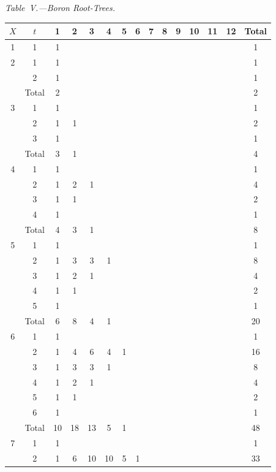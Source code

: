 \documentclass[11pt,a4paper]{article}
\begin{document}
{\textit{Table~V.---Boron Root-Trees.}
\begin{center}
\small
\begin{longtable}{|c|c|c|c|c|c|c|c|c|c|c|c|c|c|c|}
\hline
$X$ & $t$ & 1 & 2 & 3 & 4 & 5 & 6 & 7 & 8 & 9 & 10 & 11 & 12 & Total \\
\hline
\endfirsthead
1 & 1 & 1 & & & & & & & & & & & & 1 \\
\hline
2 & 1 & 1 & & & & & & & & & & & & 1 \\
  & 2 & 1 & & & & & & & & & & & & 1 \\
  & Total & 2 & & & & & & & & & & & & 2 \\
\hline
3 & 1 & 1 & & & & & & & & & & & & 1 \\
  & 2 & 1 & 1 & & & & & & & & & & & 2 \\
  & 3 & 1 & & & & & & & & & & & & 1 \\
  & Total & 3 & 1 & & & & & & & & & & & 4 \\
\hline
4 & 1 & 1 & & & & & & & & & & & & 1 \\
  & 2 & 1 & 2 & 1 & & & & & & & & & & 4 \\
  & 3 & 1 & 1 & & & & & & & & & & & 2 \\
  & 4 & 1 & & & & & & & & & & & & 1 \\
  & Total & 4 & 3 & 1 & & & & & & & & & & 8 \\
\hline
5 & 1 & 1 & & & & & & & & & & & & 1 \\
  & 2 & 1 & 3 & 3 & 1 & & & & & & & & & 8 \\
  & 3 & 1 & 2 & 1 & & & & & & & & & & 4 \\
  & 4 & 1 & 1 & & & & & & & & & & & 2 \\
  & 5 & 1 & & & & & & & & & & & & 1 \\
  & Total & 6 & 8 & 4 & 1 & & & & & & & & & 20 \\
\hline
6 & 1 & 1 & & & & & & & & & & & & 1 \\
  & 2 & 1 & 4 & 6 & 4 & 1 & & & & & & & & 16 \\
  & 3 & 1 & 3 & 3 & 1 & & & & & & & & & 8 \\
  & 4 & 1 & 2 & 1 & & & & & & & & & & 4 \\
  & 5 & 1 & 1 & & & & & & & & & & & 2 \\
  & 6 & 1 & & & & & & & & & & & & 1 \\
  & Total & 10 & 18 & 13 & 5 & 1 & & & & & & & & 48 \\
\hline
7 & 1 & 1 & & & & & & & & & & & & 1 \\
  & 2 & 1 & 6 & 10 & 10 & 5 & 1 & & & & & & & 33 \\

\end{longtable}
\end{center}}
\end{document}
